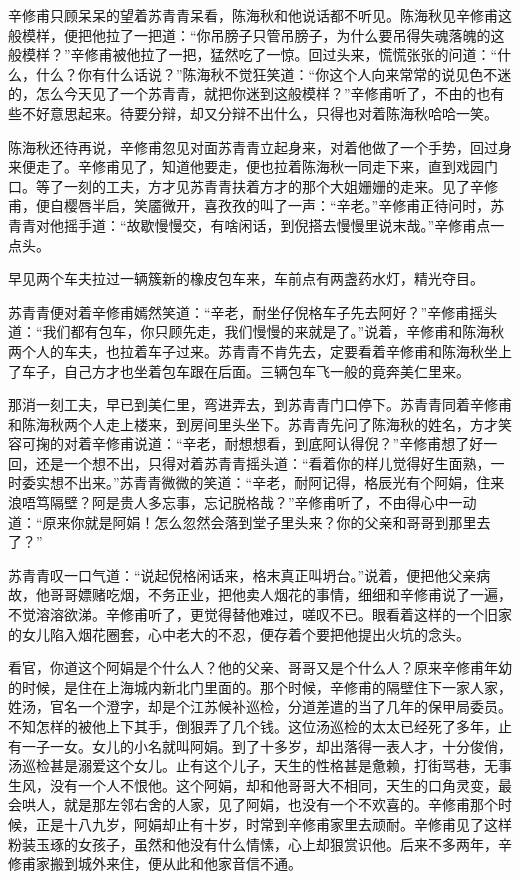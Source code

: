 \documentclass[12pt,UTF8]{ctexbook}
\begin{document}
{{{辛修甫只顾呆呆的望着苏青青呆看，陈海秋和他说话都不听见。陈海秋见辛修甫这般模样，便把他拉了一把道：“你吊膀子只管吊膀子，为什么要吊得失魂落魄的这般模样？”辛修甫被他拉了一把，猛然吃了一惊。回过头来，慌慌张张的问道：“什么，什么？你有什么话说？”陈海秋不觉狂笑道：“你这个人向来常常的说见色不迷的，怎么今天见了一个苏青青，就把你迷到这般模样？”辛修甫听了，不由的也有些不好意思起来。待要分辩，却又分辩不出什么，只得也对着陈海秋哈哈一笑。

陈海秋还待再说，辛修甫忽见对面苏青青立起身来，对着他做了一个手势，回过身来便走了。辛修甫见了，知道他要走，便也拉着陈海秋一同走下来，直到戏园门口。等了一刻的工夫，方才见苏青青扶着方才的那个大姐姗姗的走来。见了辛修甫，便自樱唇半启，笑靥微开，喜孜孜的叫了一声：“辛老。”辛修甫正待问时，苏青青对他摇手道：“故歇慢慢交，有啥闲话，到倪搭去慢慢里说末哉。”辛修甫点一点头。

早见两个车夫拉过一辆簇新的橡皮包车来，车前点有两盏药水灯，精光夺目。

苏青青便对着辛修甫嫣然笑道：“辛老，耐坐仔倪格车子先去阿好？”辛修甫摇头道：“我们都有包车，你只顾先走，我们慢慢的来就是了。”说着，辛修甫和陈海秋两个人的车夫，也拉着车子过来。苏青青不肯先去，定要看着辛修甫和陈海秋坐上了车子，自己方才也坐着包车跟在后面。三辆包车飞一般的竟奔美仁里来。

那消一刻工夫，早已到美仁里，弯进弄去，到苏青青门口停下。苏青青同着辛修甫和陈海秋两个人走上楼来，到房间里头坐下。苏青青先问了陈海秋的姓名，方才笑容可掬的对着辛修甫说道：“辛老，耐想想看，到底阿认得倪？”辛修甫想了好一回，还是一个想不出，只得对着苏青青摇头道：“看着你的样儿觉得好生面熟，一时委实想不出来。”苏青青微微的笑道：“辛老，耐阿记得，格辰光有个阿娟，住来浪唔笃隔壁？阿是贵人多忘事，忘记脱格哉？”辛修甫听了，不由得心中一动道：“原来你就是阿娟！怎么忽然会落到堂子里头来？你的父亲和哥哥到那里去了？”

苏青青叹一口气道：“说起倪格闲话来，格末真正叫坍台。”说着，便把他父亲病故，他哥哥嫖赌吃烟，不务正业，把他卖人烟花的事情，细细和辛修甫说了一遍，不觉溶溶欲涕。辛修甫听了，更觉得替他难过，嗟叹不已。眼看着这样的一个旧家的女儿陷入烟花圈套，心中老大的不忍，便存着个要把他提出火坑的念头。

看官，你道这个阿娟是个什么人？他的父亲、哥哥又是个什么人？原来辛修甫年幼的时候，是住在上海城内新北门里面的。那个时候，辛修甫的隔壁住下一家人家，姓汤，官名一个澄字，却是个江苏候补巡检，分道差遣的当了几年的保甲局委员。不知怎样的被他上下其手，倒狠弄了几个钱。这位汤巡检的太太已经死了多年，止有一子一女。女儿的小名就叫阿娟。到了十多岁，却出落得一表人才，十分俊俏，汤巡检甚是溺爱这个女儿。止有这个儿子，天生的性格甚是惫赖，打街骂巷，无事生风，没有一个人不恨他。这个阿娟，却和他哥哥大不相同，天生的口角灵变，最会哄人，就是那左邻右舍的人家，见了阿娟，也没有一个不欢喜的。辛修甫那个时候，正是十八九岁，阿娟却止有十岁，时常到辛修甫家里去顽耐。辛修甫见了这样粉装玉琢的女孩子，虽然和他没有什么情愫，心上却狠赏识他。后来不多两年，辛修甫家搬到城外来住，便从此和他家音信不通。

}}}
\end{document}
